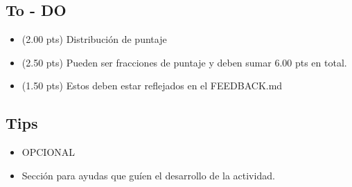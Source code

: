 \documentclass[10pt]{extarticle}
\begin{document}
\subsection*{To - DO}
\begin{itemize}
    \item (2.00 pts) Distribución de puntaje
    \item (2.50 pts) Pueden ser fracciones de puntaje y deben sumar 6.00 pts en total.
    \item (1.50 pts) Estos deben estar reflejados en el FEEDBACK.md
\end{itemize}


\subsection*{Tips}

\begin{itemize}
    \item OPCIONAL
    \item Sección para ayudas que guíen el desarrollo de la actividad.
\end{itemize}
\end{document}
